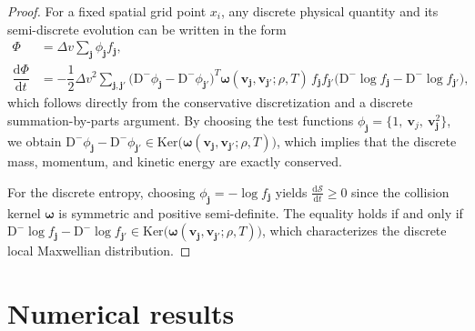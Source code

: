 \documentclass[preprint,1p,times]{elsarticle}
\theoremstyle{definition}
\theoremstyle{remark}
\begin{document}
\begin{proof}
For a fixed spatial grid point $x_i$, any discrete physical quantity and its semi-discrete evolution can be written in the form
\begin{equation}
    \begin{aligned}
        \Phi &= \Delta v \sum_{\bm{j}} \phi_{\bm{j}} f_{\bm{j}}, \\
        \dfrac{\mathrm d \Phi}{\mathrm d t}
        &= -\dfrac{1}{2}\Delta v^{2}
        \sum_{\bm{j},\bm{j}'}
        \bigl(\mathrm{D}^{-}\phi_{\bm{j}}
        - \mathrm{D}^{-}\phi_{\bm{j}'}\bigr)^{T}
        \bm{\omega}(\bm{v}_{\bm{j}},\bm{v}_{\bm{j}'};\rho,T)\,
        f_{\bm{j}} f_{\bm{j}'}
        \bigl(\mathrm{D}^{-}\log f_{\bm{j}}
        - \mathrm{D}^{-}\log f_{\bm{j}'}\bigr),
    \end{aligned}
\end{equation}
which follows directly from the conservative discretization and a discrete summation-by-parts argument.
By choosing the test functions $\phi_{\bm{j}} = \{1, ~ \bm{v}_{j},~ \bm{v}_{\bm{j}}^{2} \}$, we obtain $\mathrm{D}^{-}\phi_{\bm{j}} - \mathrm{D}^{-}\phi_{\bm{j}'} \in \text{Ker}\bigl(\bm{\omega}(\bm{v}_{\bm{j}},\bm{v}_{\bm{j}'};\rho,T)\bigr)$, which implies that the discrete mass, momentum, and kinetic energy are exactly conserved.

For the discrete entropy, choosing $\phi_{\bm{j}}=-\log f_{\bm{j}}$ yields $\frac{\mathrm d \mathcal S}{\mathrm d t} \geq 0$ since the collision kernel $\bm{\omega}$ is symmetric and positive semi-definite.
The equality holds if and only if $\mathrm{D}^{-}\log f_{\bm{j}} - \mathrm{D}^{-}\log f_{\bm{j}'} \in \text{Ker}\bigl(\bm{\omega}(\bm{v}_{\bm{j}},\bm{v}_{\bm{j}'};\rho,T)\bigr)$, which characterizes the discrete local Maxwellian distribution.
\end{proof}






\section{Numerical results}\label{sec:numerical}
\end{document}
